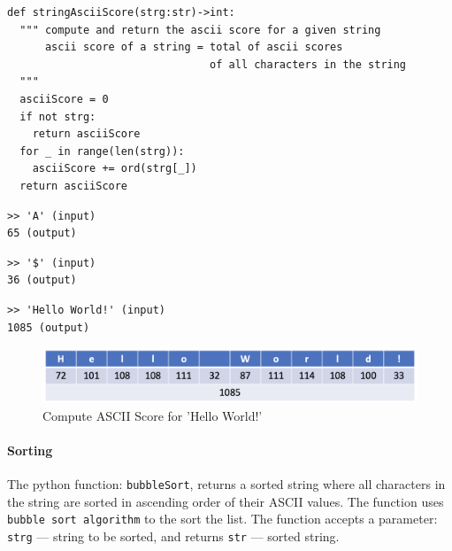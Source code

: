 \documentclass[UTF8, letter]{article}
\begin{document}
\begin{codeblock}
\begin{verbatim}
def stringAsciiScore(strg:str)->int:
  """ compute and return the ascii score for a given string
      ascii score of a string = total of ascii scores 
                                of all characters in the string
  """
  asciiScore = 0
  if not strg:
    return asciiScore
  for _ in range(len(strg)):
    asciiScore += ord(strg[_])
  return asciiScore
\end{verbatim}
\end{codeblock}

\vspace{5mm}
\begin{codeblock}[frametitle=Output --- ASCII Score:]
\begin{verbatim}
>> 'A' (input)
65 (output)
\end{verbatim}
\end{codeblock}

\vspace{5mm}
\begin{codeblock}[frametitle=Output --- ASCII Score:]
\begin{verbatim}
>> '$' (input)
36 (output)
\end{verbatim}
\end{codeblock}

\vspace{5mm}
\begin{codeblock}[frametitle=Output --- ASCII Score:]
\begin{verbatim}
>> 'Hello World!' (input)
1085 (output)
\end{verbatim}
\end{codeblock}

\vspace{5mm}
\begin{figure}[h!]
  \includegraphics[width=\linewidth]{ascii_score.png}
  \caption{Compute ASCII Score for 'Hello World!'}
  \label{fig:boat1}
\end{figure}


\pagebreak
\paragraph{Sorting}
The python function: \texttt{bubbleSort}, returns a sorted string where all characters in the string are sorted in ascending order of their ASCII values. The function uses \texttt{bubble sort algorithm} to the sort the list. The function accepts a parameter: \texttt{strg} --- string to be sorted, and returns \texttt{str} --- sorted string.
\end{document}
